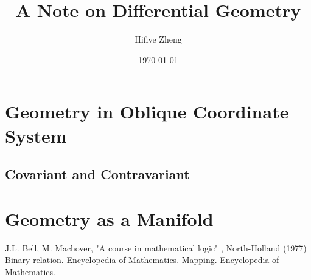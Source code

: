 \documentclass{report}
\title{A Note on Differential Geometry}
\author{Hifive Zheng}
\date{\today}
\begin{document}
    \maketitle


    

    \chapter{Geometry in Oblique Coordinate System}
    \section{Covariant and Contravariant}

    \chapter{Geometry as a Manifold}


    \begin{thebibliography}{99}
        J.L. Bell, M. Machover, "A course in mathematical logic" , North-Holland (1977)
        Binary relation. Encyclopedia of Mathematics.
        Mapping. Encyclopedia of Mathematics.
    \end{thebibliography}
\end{document}

